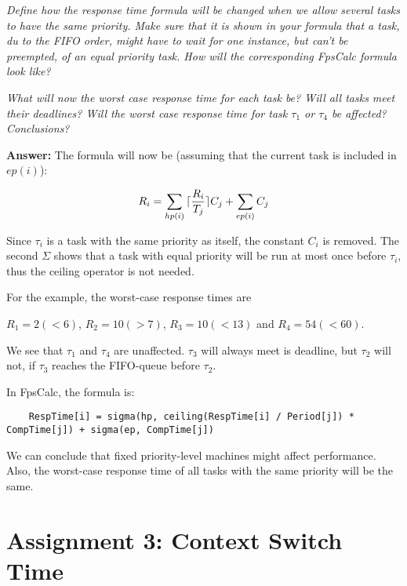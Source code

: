 \documentclass[a4paper,10pt]{article}
\DeclarePairedDelimiter{\ceil}{\lceil}{\rceil}
\newcommand{\answer}{\textbf{Answer: }}
\begin{document}
\begin{enumerate}
	\emph{Define how the response time formula will be changed when we allow several tasks to have the same priority. Make sure that it is shown in your formula that a task, du to the FIFO order, might have to wait for one instance, but can't be preempted, of an equal priority task. How will the corresponding FpsCalc formula look like?}
	
	\emph{What will now the worst case response time for each task be? Will all tasks meet their deadlines? Will the worst case response time for task $\tau_1$ or $\tau_4$ be affected? Conclusions?}
	
	\answer The formula will now be (assuming that the current task is included in $ep(i)$):
	
	\begin{equation*}
		R_i = \sum_{hp(i)}{\ceil{\frac{R_i}{T_j}}C_j} + \sum_{ep(i)}{C_j}
	\end{equation*}
	
	Since $\tau_i$ is a task with the same priority as itself, the constant $C_i$ is removed. The second $\Sigma$ shows that a task with equal priority will be run at most once before $\tau_i$, thus the ceiling operator is not needed.
	
	For the example, the worst-case response times are
	
	$R_1 = 2 (< 6)$, $R_2 = 10 (> 7)$, $R_3 = 10 (< 13)$ and $R_4 = 54 (< 60)$.
	
	We see that $\tau_1$ and $\tau_4$ are unaffected. $\tau_3$ will always meet is deadline, but $\tau_2$ will not, if $\tau_3$ reaches the FIFO-queue before $\tau_2$.
	
	In FpsCalc, the formula is:
	
	\begin{lstlisting}
	RespTime[i] = sigma(hp, ceiling(RespTime[i] / Period[j]) * CompTime[j]) + sigma(ep, CompTime[j])
	\end{lstlisting}
	
	We can conclude that fixed priority-level machines might affect performance. Also, the worst-case response time of all tasks with the same priority will be the same.
	
\end{enumerate}

\section{Assignment 3: Context Switch Time}
\end{document}
